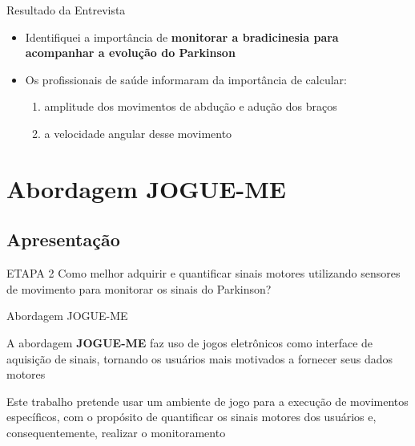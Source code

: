 \documentclass{beamer}
\begin{document}
\begin{frame}{Resultado da Entrevista} 
    \begin{block}{}
			\begin{itemize}
				\item Identifiquei a importância de \textbf{monitorar a bradicinesia para acompanhar a evolução do Parkinson}
				\item Os profissionais de saúde informaram da importância de calcular:
					\begin{enumerate}
						\item amplitude dos movimentos de abdução e adução dos braços
						\item a velocidade angular desse movimento
					\end{enumerate}
			\end{itemize}
    \end{block}
\end{frame} 




\section{Abordagem JOGUE-ME}


\subsection{Apresentação}
\begin{frame}
  \begin{block}{ETAPA 2}
   Como melhor adquirir e quantificar sinais motores utilizando sensores de movimento para monitorar os sinais do Parkinson?
  \end{block}
\end{frame}

\begin{frame}{Abordagem JOGUE-ME}
    \begin{block}{}
    A abordagem \textbf{JOGUE-ME} faz uso de jogos eletrônicos como interface de aquisição de sinais, tornando os usuários mais motivados a fornecer seus dados motores
    \end{block}
    
    
    \begin{block}{}
    Este trabalho pretende usar um ambiente de jogo para a execução de movimentos específicos, com o propósito de quantificar os sinais motores dos usuários e, consequentemente, realizar o monitoramento
    \end{block}
\end{frame}
\end{document}
